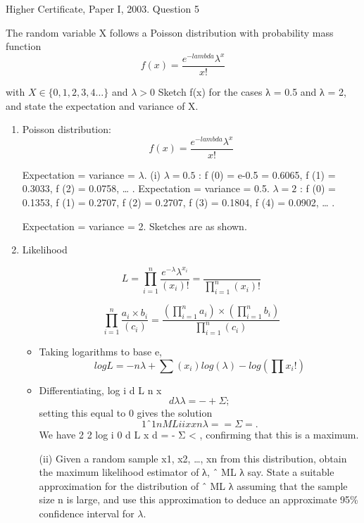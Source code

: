 \documentclass[a4paper,12pt]{article}
\begin{document}
Higher Certificate, Paper I, 2003. Question 5
\begin{framed}
The random variable X follows a Poisson distribution with probability mass
function
\[f(x) = \frac{e^{-lambda} \lambda^{x}}{x!}\]

with $X \in \{0,1,2,3,4\ldots\}$ and $\lambda >0$
Sketch f(x) for the cases λ = 0.5 and λ = 2, and state the expectation and
variance of X.
\end{framed}


\begin{enumerate}
\item Poisson distribution: 
  \[f(x) = \frac{e^{-lambda} \lambda^{x}}{x!}\]

Expectation = variance = $\lambda$.
(i) 
$\lambda = 0.5$ : f (0) = e-0.5 = 0.6065, f (1) = 0.3033, f (2) = 0.0758, … .
Expectation = variance = 0.5.
$\lambda = 2$ : f (0) = 0.1353, f (1) = 0.2707, f (2) = 0.2707, f (3) = 0.1804,
f (4) = 0.0902, … . 

Expectation = variance = 2.
Sketches are as shown.
\item Likelihood 

\[ L = \prod^n_{i=1} \frac{e^{-\lambda} \lambda^{x_i}}{(x_i)!} = \frac{}{\prod^n_{i=1}(x_i)!} \]

\begin{framed}
\[\prod^n_{i=1} \frac{a_i \times b_i }{(c_i)}  = \frac{(\prod^n_{i=1}a_i) \times (\prod^n_{i=1}b_i) }{\prod^n_{i=1}(c_i)}\]
\end{framed}

\begin{itemize}
\item Taking logarithms to base e,
\[log L = - n\lambda + \sum (x_i) log (\lambda ) - log( \prod x_i !)  \]   

\item Differentiating, log i d L n x
\[d\lambda \lambda
= - + Σ ; \] setting this equal to 0 gives the solution
\[1
ˆ 1 n
ML i
i
x x
n
\lambda
=
  = Σ = . \]We have
2
2
log i 0 d L x
d\lambda {}
= - Σ < , confirming that this is
a maximum.

\newpage
\begin{framed}
(ii) Given a random sample x1, x2, …, xn from this distribution, obtain the
maximum likelihood estimator of λ, ˆ
ML λ say. State a suitable approximation
for the distribution of ˆ
ML λ assuming that the sample size n is large, and use this
approximation to deduce an approximate 95\% confidence interval for $\lambda$.
\end{framed}



\end{itemize}
\end{enumerate}
\end{document}
